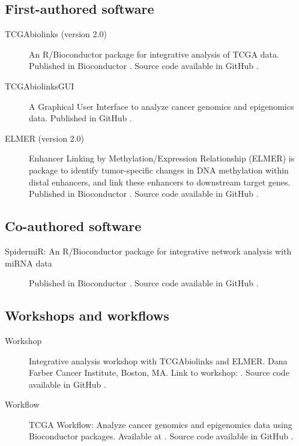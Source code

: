 \subsection{First-authored software}
\begin{description}
	\item[TCGAbiolinks (version 2.0)] An R/Bioconductor package for integrative analysis of TCGA data. Published in Bioconductor . Source code available in GitHub .
    \item[TCGAbiolinksGUI] A Graphical User Interface to analyze cancer genomics and epigenomics data. Published in GitHub .
    \item[ELMER (version 2.0)] Enhancer Linking by Methylation/Expression Relationship (ELMER) is package to identify tumor-specific changes in DNA methylation within distal enhancers, and link these enhancers to downstream target genes. Published in Bioconductor . Source code available in GitHub  .
\end{description}

\subsection{Co-authored software}
\begin{description}
	\item[SpidermiR: An R/Bioconductor package for integrative network analysis with miRNA data]{Published in Bioconductor . Source code available in GitHub }.
\end{description}


\subsection{Workshops and workflows}
\begin{description}
\item[Workshop]{Integrative analysis workshop with TCGAbiolinks and ELMER. Dana Farber Cancer Institute, Boston, MA. Link to workshop: . Source code available in GitHub .}
\item[Workflow]{TCGA Workflow: Analyze cancer genomics and epigenomics data using Bioconductor packages. Available at . Source code available in GitHub .}

\end{description}

